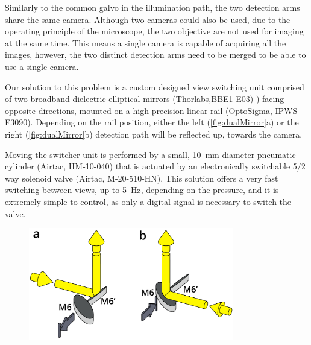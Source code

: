     Similarly to the common galvo in the illumination path, the two detection arms share the same camera. Although two cameras could also be used, due to the operating principle of the microscope, the two objective are not used for imaging at the same time. This means a single camera is capable of acquiring all the images, however, the two distinct detection arms need to be merged to be able to use a single camera.
    
    Our solution to this problem is a custom designed view switching unit comprised of two broadband dielectric elliptical mirrors (Thorlabs,BBE1-E03) ) facing opposite directions, mounted on a high precision linear rail (OptoSigma, IPWS-F3090). Depending on the rail position, either the left (\autoref{fig:dualMirror}a) or the right (\autoref{fig:dualMirror}b) detection path will be reflected up, towards the camera. 

    Moving the switcher unit is performed by a small, \SI{10}{mm} diameter pneumatic cylinder (Airtac, HM-10-040) that is actuated by an electronically switchable 5/2 way solenoid valve (Airtac, M-20-510-HN). This solution offers a very fast switching between views, up to \SI{5}{Hz}, depending on the pressure, and it is extremely simple to control, as only a digital signal is necessary to switch the valve. 

      \label{sec:dualMirror}
      \begin{figure}[tb]
        \centering
        \includegraphics[width=0.8\textwidth]{SW/dualMirrorFigure}
        \label{fig:dualMirror}
      \end{figure}
        

